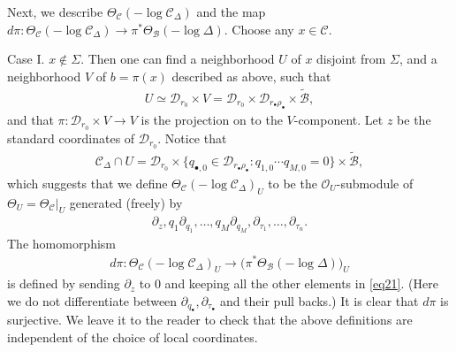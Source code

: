 \documentclass[12pt,a4paper,notitlepage]{report}
\theoremstyle{definition}
\theoremstyle{plain}
\newcommand{\mc}{\mathcal}
\newcommand{\wtd}{\widetilde}
\newcommand{\scr}{\mathscr}
\newcommand{\blt}{\bullet}
\numberwithin{equation}{section}
\begin{document}
Next, we describe $\Theta_{\mc C}(-\log \mc C_\Delta)$ and the map $d\pi:\Theta_{\mc C}(-\log \mc C_\Delta)\rightarrow\pi^*\Theta_{\mc B}(-\log\Delta)$. Choose any $x\in\mc C$. 

Case I. $x\notin\Sigma$. Then one can find a neighborhood $U$ of $x$ disjoint from $\Sigma$, and a neighborhood $V$ of $b=\pi(x)$ described as above, such that
\begin{gather*}
U\simeq \mc D_{r_0}\times V=\mc D_{r_0}\times\mc D_{r_\blt\rho_\blt}\times\wtd{\mc B},
\end{gather*}
and that $\pi: \mc D_{r_0}\times V\rightarrow V$ is the projection on to the $V$-component. Let $z$ be the standard coordinates of $\mc D_{r_0}$. Notice that
\begin{gather*}
\mc C_\Delta\cap U=\mc D_{r_0}\times\{q_{\blt,0}\in\mc D_{r_\blt\rho_\blt}:q_{1,0}\cdots q_{M,0}=0\}\times\wtd{\mc B},
\end{gather*}
which suggests that we define $\Theta_{\mc C}(-\log \mc C_\Delta)_U$ to be the $\scr O_U$-submodule of $\Theta_U=\Theta_{\mc C}|_U$ generated (freely) by
\begin{align}
\partial_z,q_1\partial_{q_1},\dots,q_M\partial_{q_M},\partial_{\tau_1},\dots,\partial_{\tau_n}.\label{eq21}
\end{align}
The homomorphism
\begin{align}
d\pi:\Theta_{\mc C}(-\log \mc C_\Delta)_U\rightarrow \big(\pi^*\Theta_{\mc B}(-\log\Delta)\big)_U\label{eq23}
\end{align}
is defined by sending $\partial_z$ to $0$ and keeping all the other elements in \eqref{eq21}. (Here we do not differentiate between $\partial_{q_\blt},\partial_{\tau_\blt}$ and their pull backs.) It is clear that $d\pi$ is surjective. We leave it to the reader to check that the above definitions are independent of the choice of local coordinates.
\end{document}
